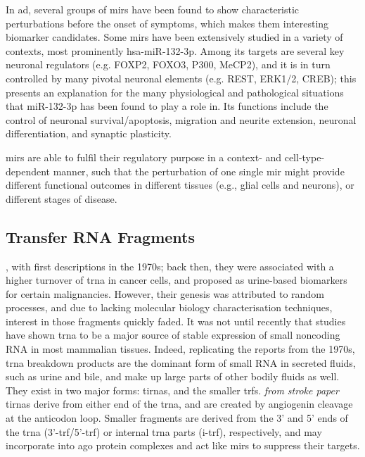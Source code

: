 In \ac{ad}, several groups of \acp{mir} have been found to show characteristic perturbations before the onset of symptoms, which makes them interesting biomarker candidates\cite{Salta2017a}. Some \acp{mir} have been extensively studied in a variety of contexts, most prominently hsa-miR-132-3p. Among its targets are several key neuronal regulators (e.g. FOXP2, FOXO3, P300, MeCP2), and it is in turn controlled by many pivotal neuronal elements (e.g. REST, ERK1/2, CREB); this presents an explanation for the many physiological and pathological situations that miR-132-3p has been found to play a role in. Its functions include the control of neuronal survival/apoptosis, migration and neurite extension, neuronal differentiation, and synaptic plasticity. 

\acp{mir} are able to fulfil their regulatory purpose in a context- and cell-type-dependent manner\cite{Lu2015}, such that the perturbation of one single \ac{mir} might provide different functional outcomes in different tissues (e.g., glial cells and neurons), or different stages of disease.


\subsection{Transfer RNA Fragments}
, with first descriptions in the 1970s; back then, they were associated with a higher turnover of \ac{trna} in cancer cells\cite{Borek1977}, and proposed as urine-based biomarkers for certain malignancies\cite{Speer1979}. However, their genesis was attributed to random processes, and due to lacking molecular biology characterisation techniques, interest in those fragments quickly faded. It was not until recently that studies have shown \ac{trna} to be a major source of stable expression of small noncoding RNA\cite{Cole2009,Lee2009} in most mammalian tissues. Indeed, replicating the reports from the 1970s, \ac{trna} breakdown products are the dominant form of small RNA in secreted fluids, such as urine and bile, and make up large parts of other bodily fluids as well\cite{Godoy2018}. They exist in two major forms: \acp{tirna}, and the smaller \acfp{trf}. \textit{from stroke paper} \acp{tirna} derive from either end of the \ac{trna}, and are created by angiogenin cleavage at the anticodon loop\cite{Yamasaki2009,Ivanov2011}. Smaller fragments are derived from the 3’ and 5’ ends of the \ac{trna} (3'-\ac{trf}/5'-\ac{trf}) or internal \ac{trna} parts (i-\ac{trf}), respectively, and may incorporate into \ac{ago} protein complexes and act like \acp{mir} to suppress their targets\cite{Burroughs2011,Kumar2014}.

